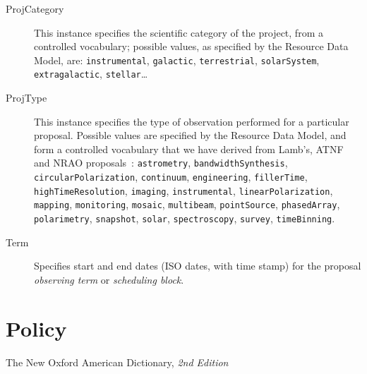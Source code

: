 \begin{description}
			\item[ProjCategory]  This instance specifies the
			scientific category of the project, from a controlled
			vocabulary; possible values, as specified by the Resource
			Data Model, are: \texttt{instrumental}, \texttt{galactic},
			\texttt{ter\-res\-tri\-al}, \texttt{so\-lar\-Sys\-tem},
			\texttt{ex\-tra\-ga\-lac\-tic}, \texttt{stellar}…

			\item[ProjType] This instance specifies the type of
			observation performed for a particular proposal.
			Possible values are specified by the Resource Data
			Model, and form a controlled vocabulary that we have
			derived from Lamb's, ATNF and NRAO
			proposals~\cite{2006astro.ph..1354, LamPow0310IVOA,
			PreCla0412Device}:
			\texttt{as\-trom\-e\-try},
			\texttt{band\-width\-Syn\-the\-sis},
			\texttt{cir\-cu\-lar\-Po\-lar\-i\-za\-tion},
			\texttt{con\-tin\-u\-um}, \texttt{en\-gi\-neer\-ing},
			\texttt{fill\-er\-Time},
			\texttt{high\-Time\-Res\-o\-lu\-tion},
			\texttt{im\-ag\-ing}, \texttt{in\-stru\-men\-tal},
			\texttt{lin\-e\-ar\-Po\-lar\-i\-za\-tion},
			\texttt{map\-ping}, \texttt{mon\-i\-to\-ring},
			\texttt{mo\-sa\-ic}, \texttt{mul\-ti\-beam},
			\texttt{point\-Source}, \texttt{phased\-Ar\-ray},
			\texttt{po\-lar\-im\-e\-try}, \texttt{snap\-shot},
			\texttt{so\-lar}, \texttt{spec\-tros\-copy},
			\texttt{sur\-vey}, \texttt{time\-Bin\-ning}.
			
			\item[Term] Specifies start and end dates (ISO dates,
			with time stamp) for the proposal \emph{observing term}
			or \emph{scheduling block}.
		\end{description}
		
		
		
		
	
	\section{Policy} %
	\label{sec:policy}
		{The New  Oxford American Dictionary, \emph{2nd Edition}}
		
